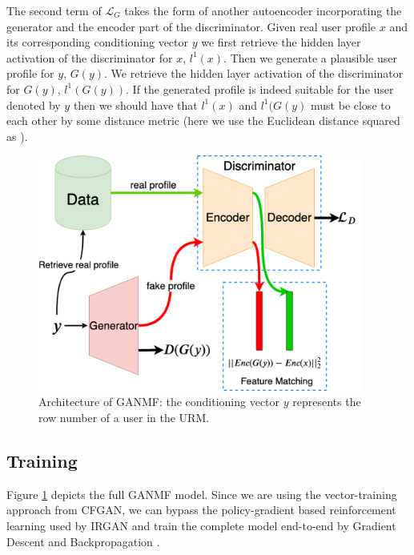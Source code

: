 The second term of $\mathcal{L}_{G}$ takes the form of another autoencoder incorporating the generator and the encoder part of the discriminator. Given real user profile $x$ and its corresponding conditioning vector $y$ we first retrieve the hidden layer activation of the discriminator for $x$, $l^1(x)$. Then we generate a plausible user profile for $y$, $G(y)$. We retrieve the hidden layer activation of the discriminator for $G(y)$, $l^1(G(y))$. If the generated profile is indeed suitable for the user denoted by $y$ then we should have that $l^1(x)$ and $l^1(G(y)$ must be close to each other by some distance metric (here we use the Euclidean distance squared as \cite{salimans2016improved}).

\begin{figure}
    \centering
    \includegraphics[width=0.95\textwidth]{model/full_GANMF.png}
    \caption{Architecture of GANMF: the conditioning vector $y$ represents the row number of a user in the URM.}
    \label{fig:full_ganmf}
\end{figure}

\subsection{Training}
Figure \ref{fig:full_ganmf} depicts the full GANMF model. Since we are using the vector-training approach from CFGAN, we can bypass the policy-gradient based reinforcement learning used by IRGAN and train the complete model end-to-end by Gradient Descent and Backpropagation \cite{rumelhart1986learning}.